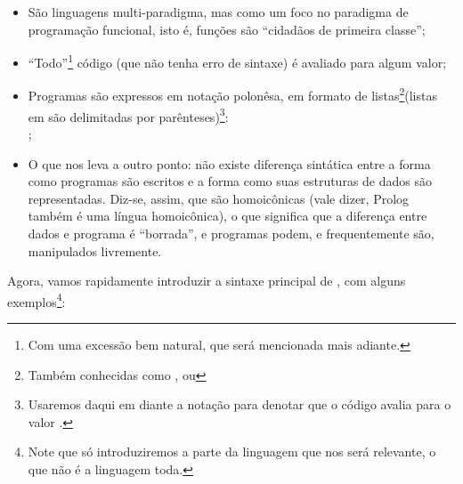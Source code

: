 \begin{itemize}
\item São linguagens multi-paradigma, mas como um
  foco no paradigma de programação funcional, isto é,
  funções são ``cidadãos de primeira classe'';
\item ``Todo''\footnote{Com uma excessão bem
    natural, que será mencionada mais adiante.} código
   (que não tenha erro de sintaxe) é avaliado para
  algum valor;
\item Programas são expressos em notação polonêsa, em formato de
  listas\footnote{Também conhecidas como , ou
    }(listas em  são delimitadas por
  parênteses)\footnote{Usaremos daqui em diante a notação
     para denotar que o código
     avalia para o valor .}:
  \\
   ;
\item O que nos leva a outro ponto: não existe diferença
  sintática entre a forma como programas  são escritos
  e a forma como suas estruturas de dados são representadas. Diz-se,
  assim, que  são homoicônicas (vale dizer, Prolog
  também é uma língua homoicônica), o que significa que a diferença
  entre dados e programa é ``borrada'', e programas podem, e
  frequentemente são, manipulados livremente.
\end{itemize}

Agora, vamos rapidamente introduzir a sintaxe principal de
, com alguns exemplos\footnote{Note que só
  introduziremos a parte da linguagem que nos será relevante, o que
  não é a linguagem toda.}:

